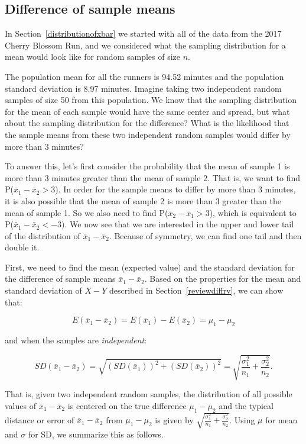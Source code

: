 \subsection{Difference of sample means}
In Section~\ref{distributionofxbar} we started with all of the data from the 2017 Cherry Blossom Run, and we considered what the sampling distribution for a mean would look like for random samples of size $n$.

The population mean for all the runners is 94.52 minutes and the population standard deviation is 8.97 minutes.  Imagine taking two independent random samples of size 50 from this population.  We know that the sampling distribution for the mean of each sample would have the same center and spread, but what about the sampling distribution for the difference?  What is the likelihood that the sample means from these two independent random samples would differ by more than 3 minutes?  

To answer this, let's first consider the probability that the mean of sample 1 is more than 3 minutes greater than the mean of sample 2.  That is, we want to find P($\bar{x}_1 - \bar{x}_2 > 3$).  In order for the sample means to differ by more than 3 minutes, it is also possible that the mean of sample 2 is more than 3 greater than the mean of sample 1.  So we also need to find P($\bar{x}_2 - \bar{x}_1 > 3$), which is equivalent to P($\bar{x}_1 - \bar{x}_2 <- 3)$.  We now see that we are interested in the upper and lower tail of the distribution of $\bar{x}_1 - \bar{x}_2$.  Because of symmetry, we can find one tail and then double it.

First, we need to find the mean (expected value) and the standard deviation for the difference of sample means $\bar{x}_1 - \bar{x}_2$.  Based on the properties for the mean and standard deviation of $X - Y$ described in Section~\ref{reviewdiffrv}, we can show that:

$$E(\bar{x}_1 - \bar{x}_2) = E(\bar{x}_1) - E(\bar{x}_2) = \mu_1 - \mu_2$$

 \noindent and when the samples are \emph{independent}:

$$SD(\bar{x}_1 - \bar{x}_2) =  \sqrt{(SD(\bar{x}_1))^2 + (SD(\bar{x}_2))^2}=  \sqrt{\frac{\sigma_1^2}{n_1} + \frac{\sigma_2^2}{n_2}}.$$

 That is, given two independent random samples, the distribution of all possible values of $\bar{x}_1 - \bar{x}_2$ is centered on the true difference $\mu_1-\mu_2$ and the typical distance or error of $\bar{x}_1 - \bar{x}_2$ from $\mu_1-\mu_2$ is given by $\sqrt{\frac{\sigma_1^2}{n_1} + \frac{\sigma_2^2}{n_2}}$.  Using $\mu$ for mean and $\sigma$ for SD, we summarize this as follows.  

